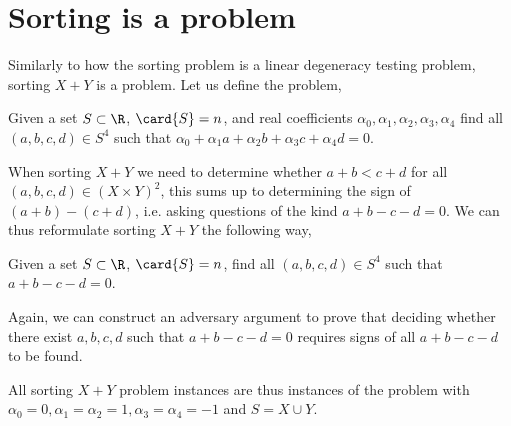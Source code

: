 \section{Sorting \XY is a \fourLDT problem}
\label{tree:related:xy4ldt}

Similarly to how the sorting problem is a linear degeneracy testing problem,
sorting $X+Y$ is a \fourLDT problem. Let us define the \fourLDT problem,

\begin{problem}
Given a set $S \subset \R$, $\card{S} = n$, and real coefficients $\alpha_0,
\alpha_1, \alpha_2, \alpha_3, \alpha_4$ find all $(a,b,c,d) \in S^4$ such that
$\alpha_0 + \alpha_1 a + \alpha_2 b + \alpha_3 c + \alpha_4 d = 0$.
\end{problem}

When sorting $X+Y$ we need to determine whether $a + b < c + d$ for all
$(a,b,c,d) \in (X \times Y)^2$, this sums up to determining the sign of $(a+b) -
(c+d)$, i.e. asking questions of the kind $a + b - c - d = 0$. We can thus
reformulate sorting $X+Y$ the following way,

\begin{problem}
Given a set $S \subset \R$, $\card{S} = n$, find all $(a,b,c,d) \in S^4$ such
that $a + b - c - d = 0$.
\end{problem}

Again, we can construct an adversary argument to prove that deciding whether
there exist \(a,b,c,d\) such that \(a+b-c-d=0\) requires signs of all
\(a+b-c-d\) to be found.

All sorting $X+Y$ problem instances are thus instances of the \fourLDT problem
with $\alpha_0 = 0, \alpha_1 = \alpha_2 = 1, \alpha_3 = \alpha_4 = -1$ and
$S = X \cup Y$.

